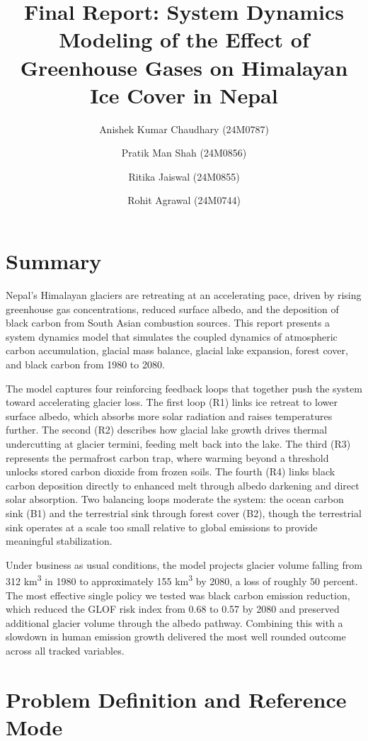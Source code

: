 \documentclass[12pt, a4paper]{article}
\title{\textbf{Final Report: System Dynamics Modeling of the Effect of Greenhouse Gases on Himalayan Ice Cover in Nepal}}
\author{
    Anishek Kumar Chaudhary (24M0787) \and
    Pratik Man Shah (24M0856) \and
    Ritika Jaiswal (24M0855) \and
    Rohit Agrawal (24M0744)
}
\date{}
\begin{document}
\maketitle

\section{Summary}

Nepal's Himalayan glaciers are retreating at an accelerating pace, driven by rising greenhouse gas concentrations, reduced surface albedo, and the deposition of black carbon from South Asian combustion sources. This report presents a system dynamics model that simulates the coupled dynamics of atmospheric carbon accumulation, glacial mass balance, glacial lake expansion, forest cover, and black carbon from 1980 to 2080.

The model captures four reinforcing feedback loops that together push the system toward accelerating glacier loss. The first loop (R1) links ice retreat to lower surface albedo, which absorbs more solar radiation and raises temperatures further. The second (R2) describes how glacial lake growth drives thermal undercutting at glacier termini, feeding melt back into the lake. The third (R3) represents the permafrost carbon trap, where warming beyond a threshold unlocks stored carbon dioxide from frozen soils. The fourth (R4) links black carbon deposition directly to enhanced melt through albedo darkening and direct solar absorption. Two balancing loops moderate the system: the ocean carbon sink (B1) and the terrestrial sink through forest cover (B2), though the terrestrial sink operates at a scale too small relative to global emissions to provide meaningful stabilization.

Under business as usual conditions, the model projects glacier volume falling from 312 km\textsuperscript{3} in 1980 to approximately 155 km\textsuperscript{3} by 2080, a loss of roughly 50 percent. The most effective single policy we tested was black carbon emission reduction, which reduced the GLOF risk index from 0.68 to 0.57 by 2080 and preserved additional glacier volume through the albedo pathway. Combining this with a slowdown in human emission growth delivered the most well rounded outcome across all tracked variables.

\section{Problem Definition and Reference Mode}
\end{document}
